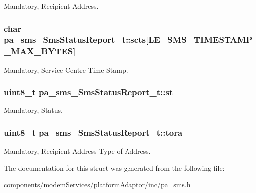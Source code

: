 Mandatory, Recipient Address. 

\subsubsection[{\texorpdfstring{scts}{scts}}]{\setlength{\rightskip}{0pt plus 5cm}char pa\+\_\+sms\+\_\+\+Sms\+Status\+Report\+\_\+t\+::scts\mbox{[}{\bf L\+E\+\_\+\+S\+M\+S\+\_\+\+T\+I\+M\+E\+S\+T\+A\+M\+P\+\_\+\+M\+A\+X\+\_\+\+B\+Y\+T\+ES}\mbox{]}}\hypertarget{structpa__sms___sms_status_report__t_afa3a78bd652b132c06d62f16d5573b19}{}\label{structpa__sms___sms_status_report__t_afa3a78bd652b132c06d62f16d5573b19}


Mandatory, Service Centre Time Stamp. 

\subsubsection[{\texorpdfstring{st}{st}}]{\setlength{\rightskip}{0pt plus 5cm}uint8\+\_\+t pa\+\_\+sms\+\_\+\+Sms\+Status\+Report\+\_\+t\+::st}\hypertarget{structpa__sms___sms_status_report__t_aa553a0384b3dc94f8af1f8c00160e2d3}{}\label{structpa__sms___sms_status_report__t_aa553a0384b3dc94f8af1f8c00160e2d3}


Mandatory, Status. 

\subsubsection[{\texorpdfstring{tora}{tora}}]{\setlength{\rightskip}{0pt plus 5cm}uint8\+\_\+t pa\+\_\+sms\+\_\+\+Sms\+Status\+Report\+\_\+t\+::tora}\hypertarget{structpa__sms___sms_status_report__t_a9a7fe34e7727fe41d1014153a71dbec9}{}\label{structpa__sms___sms_status_report__t_a9a7fe34e7727fe41d1014153a71dbec9}


Mandatory, Recipient Address Type of Address. 



The documentation for this struct was generated from the following file\+:\begin{DoxyCompactItemize}
\item 
components/modem\+Services/platform\+Adaptor/inc/\hyperlink{pa__sms_8h}{pa\+\_\+sms.\+h}\end{DoxyCompactItemize}
